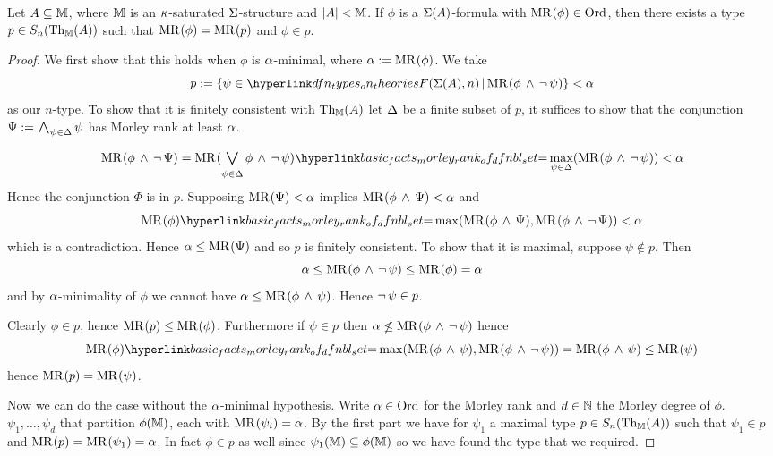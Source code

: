 \begin{lem}
    Let $A \subseteq \mathbb{M}$, where $\mathbb{M}$ is an $\kappa$-saturated $\Sigma$-structure 
    and $\left\vert A \right\vert < \mathbb{M}$.
    If $\phi$ is a $\Sigma(A)$-formula with $\mathrm{MR}^{}(\phi) \in \operatorname{Ord}$, 
    then there exists a type $p \in S_n(\mathrm{Th}_{\mathbb{M}}(A))$ such that 
    $\mathrm{MR}^{}(\phi) = \mathrm{MR}^{}(p)$ and $\phi \in p$.
\end{lem}
\begin{proof}
    We first show that this holds when $\phi$ is $\alpha$-minimal,
    where $\alpha := \mathrm{MR}^{}(\phi)$.
    We take 
    \[
        p := \set{\psi \in \linkto{dfn_types_on_theories}{F(\Si(A),n)} 
        \st \MR{}{\phi \AND \NOT \psi}} < \al
    \]
    as our $n$-type.
    To show that it is finitely consistent with $\mathrm{Th}_{\mathbb{M}}(A)$
    let $\Delta$ be a finite subset of $p$,
    it suffices to show that the conjunction 
    $\Psi := \bigand{\psi \in \De}{} \psi$
    has Morley rank at least $\alpha$.
    \[
        \MR{}{\phi \AND \NOT \Psi} = 
        \MR{}{\bigor{\psi \in \De}{} \phi \AND \NOT \psi} 
        \linkto{basic_facts_morley_rank_of_dfnbl_set}{=} 
        \max_{\psi \in \De} (\MR{}{\phi \AND \NOT \psi} ) < \al
    \]
    Hence the conjunction $\Phi$ is in $p$.
    Supposing $\mathrm{MR}^{}(\Psi) < \alpha$ implies
    $\mathrm{MR}^{}(\phi \, \land \, \Psi) < \alpha$ and 
    \[
        \MR{}{\phi} \linkto{basic_facts_morley_rank_of_dfnbl_set}{=} 
        \max (\MR{}{\phi \AND \Psi}, \MR{}{\phi \AND \NOT \Psi})
        < \al
    \]
    which is a contradiction.
    Hence $\alpha \leq \mathrm{MR}^{}(\Psi)$ and so $p$ is finitely consistent.
    To show that it is maximal, suppose $\psi \notin p$. Then 
    \[\alpha \leq \mathrm{MR}^{}(\phi \, \land \, \neg\, \psi) \leq \mathrm{MR}^{}(\phi) = \alpha\]
    and by $\alpha$-minimality of $\phi$ we cannot have 
    $\alpha \leq \mathrm{MR}^{}(\phi \, \land \, \psi)$.
    Hence $\neg\, \psi \in p$.

    Clearly $\phi \in p$, hence $\mathrm{MR}^{}(p) \leq \mathrm{MR}^{}(\phi)$.
    Furthermore if $\psi \in p$ then $\alpha \nleq \mathrm{MR}^{}(\phi \, \land \, \neg\, \psi)$
    hence 
    \[
        \MR{}{\phi} \linkto{basic_facts_morley_rank_of_dfnbl_set}{=} 
        \max (\MR{}{\phi \AND \psi}, \MR{}{\phi \AND \NOT \psi})
        = \MR{}{\phi \AND \psi} \leq \MR{}{\psi}
    \]
    hence $\mathrm{MR}^{}(p) = \mathrm{MR}^{}(\psi)$.

    Now we can do the case without the $\alpha$-minimal hypothesis.
    Write $\alpha \in \operatorname{Ord}$ for the Morley rank and 
    $d \in \mathbb{N}$ the Morley degree of $\phi$.
    $\psi_1,\dots,\psi_d$ that partition $\phi(\mathbb{M})$,
    each with $\mathrm{MR}^{}(\psi_i) = \alpha$.
    By the first part we have for $\psi_1$ a maximal type 
    $p \in S_n(\mathrm{Th}_{\mathbb{M}}(A))$ such that $\psi_1 \in p$ and 
    $\mathrm{MR}^{}(p) = \mathrm{MR}^{}(\psi_1) = \alpha$.
    In fact $\phi \in p$ as well since $\psi_1(\mathbb{M}) \subseteq \phi(\mathbb{M})$
    so we have found the type that we required.
\end{proof}

